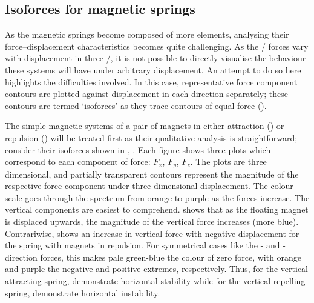 \documentclass[11pt,a4paper]{memoir}
\begin{document}

\subsection{Isoforces for magnetic springs}

As the magnetic springs become composed of more elements, analysing their force--displacement characteristics becomes quite challenging.
As the \threeD/ forces vary with displacement in three \dof/, it is not possible to directly visualise the behaviour these systems will have under arbitrary displacement.
An attempt to do so here highlights the difficulties involved.
In this case, representative force component contours are plotted against displacement in each direction separately; these contours are termed `isoforces' as they trace contours of equal force ().

The simple magnetic systems of a pair of magnets in either attraction () or repulsion () will be treated first as their qualitative analysis is straightforward; consider their isoforces shown in , \resp.
Each figure shows three plots which correspond to each component of force: $F_x$, $F_y$, $F_z$.
The plots are three dimensional, and partially transparent contours represent the magnitude of the respective force component under three dimensional displacement.
The colour scale goes through the spectrum from orange to purple as the forces increase.
The vertical components are easiest to comprehend.
 shows that as the floating magnet is displaced upwards, the magnitude of the vertical force increases (more blue).
Contrariwise,  shows an increase in vertical force with negative displacement for the spring with magnets in repulsion.
For symmetrical cases like the \x- and \y-direction forces, this makes pale green-blue the colour of zero force, with orange and purple the negative and positive extremes, respectively.
Thus, for the vertical attracting spring,  demonstrate horizontal stability while for the vertical repelling spring,   demonstrate horizontal instability.
\end{document}
